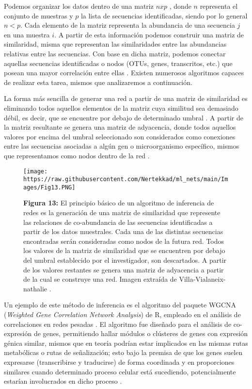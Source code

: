 \documentclass[
]{book}
\begin{document}
Podemos organizar los datos dentro de una matriz \(n x p\) , donde \(n\) representa el conjunto de muestras y \(p\) la lista de secuencias identificadas, siendo por lo general \(n<p\). Cada elemento de la matriz representa la abundancia de una secuencia \(j\) en una muestra \(i\). A partir de esta información podemos construir una matriz de similaridad, misma que representan las similaridades entre las abundancias relativas entre las secuencias. Con base en dicha matriz, podemos conectar aquellas secuencias identificadas o nodos (OTUs, genes, transcritos, etc.) que posean una mayor correlación entre ellas \citep{butte1999unsupervised}. Existen numerosos algoritmos capaces de realizar esta tarea, mismos que analizaremos a continuación.

La forma más sencilla de generar una red a partir de una matriz de similaridad es eliminando todos aquellos elementos de la matriz cuya similitud sea demasiado débil, es decir, que se encuentre por debajo de determinado umbral \citep{villaintroduction}. A partir de la matriz resultante se genera una matriz de adyacencia, donde todos aquellos valores por encima del umbral seleccionado son considerados como conexiones entre las secuencias asociadas a algún gen o microorganismo específico, mismos que representamos como nodos dentro de la red \citep{butte1999mutual}.

\begin{figure}
\centering
\texttt{[image: https://raw.githubusercontent.com/Nertekkad/ml\_nets/main/Images/Fig13.PNG]}
\caption{\textbf{Figura 13:} El principio básico de un algoritmo de inferencia de redes es la generación de una matriz de similaridad que represente las relaciones de co-abundancia de las secuencias identificadas a partir de los datos muestrales. Cada una de las distintas secuencias encontradas serán consideradas como nodos de la futura red. Todos los valores de la matriz de similaridad que se encuentren por debajo del umbral establecido por el investigador, son descartados. A partir de los valores restantes se genera una matriz de adyacencia a partir de la cual se construye una red. Imagen extraída de Villa-Vialaneix-nathalie \citep{villaintroduction}.}
\end{figure}

Un ejemplo de este método de inferencia es el algoritmo del paquete WGCNA (\emph{Weighted Gene Correlation Network Analysis}) de R, empleado en el análisis de correlaciones en redes pesadas \citep{butte1999mutual}. El algoritmo fue diseñado para el análisis de co-expresión de genes, permitiendo hallar módulos o clústeres de genes con expresión génica similar, mismos que en teoría podrían estar implicados en las mismas rutas metabólicas o rutas de señalización; esto bajo la premisa de que los genes suelen expresarse (transcribirse y traducirse) de forma coordinada y en proporciones similares cuando determinado proceso celular está sucediendo, potencialmente estarían involucrados en dicho proceso \citep{langfelder2008wgcna}.
\end{document}
